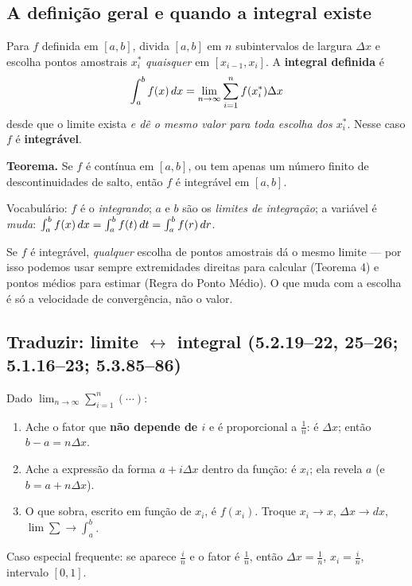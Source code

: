 \subsection{A definição geral e quando a integral existe}

\begin{definicao}
Para $f$ definida em $[a,b]$, divida $[a,b]$ em $n$ subintervalos de largura $\Delta x$ e escolha pontos amostrais $x_i^*$ \emph{quaisquer} em $[x_{i-1},x_i]$. A \textbf{integral definida} é
\[
\int_a^b f(x)\,dx=\lim_{n\to\infty}\sum_{i=1}^n f(x_i^*)\Delta x
\]
desde que o limite exista \emph{e dê o mesmo valor para toda escolha dos $x_i^*$}. Nesse caso $f$ é \textbf{integrável}.

\textbf{Teorema.} Se $f$ é contínua em $[a,b]$, ou tem apenas um número finito de descontinuidades de salto, então $f$ é integrável em $[a,b]$.

Vocabulário: $f$ é o \emph{integrando}; $a$ e $b$ são os \emph{limites de integração}; a variável é \emph{muda}: $\int_a^b f(x)\,dx=\int_a^b f(t)\,dt=\int_a^b f(r)\,dr$.
\end{definicao}

Se $f$ é integrável, \emph{qualquer} escolha de pontos amostrais dá o mesmo limite --- por isso podemos usar sempre extremidades direitas para calcular (Teorema 4) e pontos médios para estimar (Regra do Ponto Médio). O que muda com a escolha é só a velocidade de convergência, não o valor.

\subsection{Traduzir: limite $\leftrightarrow$ integral (5.2.19--22, 25--26; 5.1.16--23; 5.3.85--86)}

\begin{metodo}
Dado $\displaystyle\lim_{n\to\infty}\sum_{i=1}^n(\cdots)$:
\begin{enumerate}[leftmargin=1.6em, itemsep=1pt]
\item Ache o fator que \textbf{não depende de $i$} e é proporcional a $\frac1n$: é $\Delta x$; então $b-a=n\Delta x$.
\item Ache a expressão da forma $a+i\Delta x$ dentro da função: é $x_i$; ela revela $a$ (e $b=a+n\Delta x$).
\item O que sobra, escrito em função de $x_i$, é $f(x_i)$. Troque $x_i\to x$, $\Delta x\to dx$, $\lim\sum\to\int_a^b$.
\end{enumerate}
Caso especial frequente: se aparece $\frac{i}{n}$ e o fator é $\frac1n$, então $\Delta x=\frac1n$, $x_i=\frac in$, intervalo $[0,1]$.
\end{metodo}

